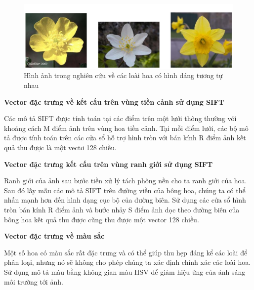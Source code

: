 \documentclass[12pt]{report}
\begin{document}
		\begin{figure}[h]
			\centering
			\includegraphics[scale=0.4]{anh_hoa_hinh_dang}
			\caption{Hình ảnh trong nghiên cứu \cite{cia-Nilsback06} về các loài hoa có hình dáng tương tự nhau}
			\label{fig:anh_hoa_hinh_dang}
		\end{figure}						 
																																														 
																																											
		\textbf{Vector đặc trưng về kết cấu trên vùng tiền cảnh sử dụng SIFT \cite{cia_SIFT}}	
																																		
		Các mô tả SIFT \cite{cia_SIFT} được tính toán tại các điểm trên một lưới thông thường với khoảng cách M điểm ảnh trên vùng hoa tiền cảnh. Tại mỗi điểm lưới, các bộ mô tả được tính toán trên các cửa sổ hỗ trợ hình tròn với bán kính R điểm ảnh kết quả thu được là một vectơ 128 chiều.						 
																																		
																																										 
		\textbf{Vector đặc trưng kết cấu trên vùng ranh giới sử dụng SIFT \cite{cia_SIFT}}												
																																		
		Ranh giới của ảnh sau bước tiền xử lý tách phông nền cho ta ranh giới của hoa. Sau đó lấy mẫu các mô tả SIFT \cite{cia_SIFT} trên đường viền của bông hoa, chúng ta có thể nhấn mạnh hơn đến hình dạng cục bộ của đường biên. Sử dụng các cửa sổ hình tròn bán kính R điểm ảnh và bước nhảy S điểm ảnh dọc theo đường biên của bông hoa kết quả thu được cũng thu được một vector 128 chiều.							
																																												
																																		
		\textbf{Vector đặc trưng về màu sắc}
																																
		Một số hoa có màu sắc rất đặc trưng và có thể giúp thu hẹp đáng kể các loài để phân loại, nhưng nó sẽ không cho phép chúng ta xác định chính xác các loài hoa. Sử dụng mô tả màu bằng không gian màu HSV \cite{cia-Nilsback06} để giảm hiệu ứng của ánh sáng môi trường tới ảnh.
																														
\end{document}
